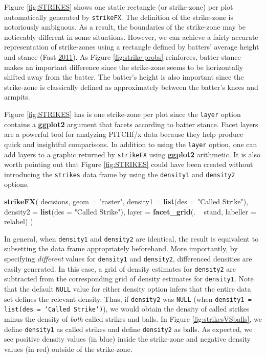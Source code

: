 \documentclass[12pt,]{isuthesis}
\newenvironment{Shaded}{\begin{snugshade}}{\end{snugshade}}
\newcommand{\KeywordTok}[1]{\textcolor[rgb]{0.13,0.29,0.53}{\textbf{{#1}}}}
\newcommand{\DataTypeTok}[1]{\textcolor[rgb]{0.13,0.29,0.53}{{#1}}}
\newcommand{\StringTok}[1]{\textcolor[rgb]{0.31,0.60,0.02}{{#1}}}
\newcommand{\NormalTok}[1]{{#1}}
\begin{document}
Figure \ref{fig:STRIKES} shows one static rectangle (or strike-zone) per
plot automatically generated by \texttt{strikeFX}. The definition of the
strike-zone is notoriously ambiguous. As a result, the boundaries of the
strike-zone may be noticeably different in some situations. However, we
can achieve a fairly accurate representation of strike-zones using a
rectangle defined by batters' average height and stance (Fast
\protect\hyperlink{ref-Strikezones}{2011}). As Figure
\ref{fig:strike-probs} reinforces, batter stance makes an important
difference since the strike-zone seems to be horizontally shifted away
from the batter. The batter's height is also important since the
strike-zone is classically defined as approximately between the batter's
knees and armpits.

Figure \ref{fig:STRIKES} has is one strike-zone per plot since the
\texttt{layer} option contains a \textbf{ggplot2} argument that facets
according to batter stance. Facet layers are a powerful tool for
analyzing PITCHf/x data because they help produce quick and insightful
comparisons. In addition to using the \texttt{layer} option, one can add
layers to a graphic returned by \texttt{strikeFX} using \textbf{ggplot2}
arithmetic. It is also worth pointing out that Figure \ref{fig:STRIKES}
could have been created without introducing the \texttt{strikes} data
frame by using the \texttt{density1} and \texttt{density2} options.

\begin{Shaded}
\begin{Highlighting}[]
\KeywordTok{strikeFX}\NormalTok{(}
  \NormalTok{decisions, }\DataTypeTok{geom =} \StringTok{"raster"}\NormalTok{, }
  \DataTypeTok{density1 =} \KeywordTok{list}\NormalTok{(}\DataTypeTok{des =} \StringTok{"Called Strike"}\NormalTok{),          }
  \DataTypeTok{density2 =} \KeywordTok{list}\NormalTok{(}\DataTypeTok{des =} \StringTok{"Called Strike"}\NormalTok{),}
  \DataTypeTok{layer =} \KeywordTok{facet_grid}\NormalTok{(. ~}\StringTok{ }\NormalTok{stand, }\DataTypeTok{labeller =} \NormalTok{relabel)}
\NormalTok{)}
\end{Highlighting}
\end{Shaded}

In general, when \texttt{density1} and \texttt{density2} are identical,
the result is equivalent to subsetting the data frame appropriately
beforehand. More importantly, by specifying \emph{different} values for
\texttt{density1} and \texttt{density2}, differenced densities are
easily generated. In this case, a grid of density estimates for
\texttt{density2} are subtracted from the corresponding grid of density
estimates for \texttt{density1}. Note that the default \texttt{NULL}
value for either density option infers that the entire data set defines
the relevant density. Thus, if \texttt{density2} was \texttt{NULL} (when
\texttt{density1 = list(des = 'Called Strike')}), we would obtain the
density of called strikes minus the density of \emph{both} called
strikes and balls. In Figure \ref{fig:strikesVSballs}, we define
\texttt{density1} as called strikes and define \texttt{density2} as
balls. As expected, we see positive density values (in blue) inside the
strike-zone and negative density values (in red) outside of the
strike-zone.
\end{document}
